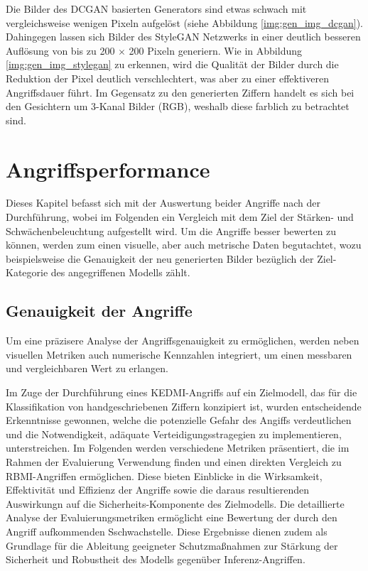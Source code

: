 Die Bilder des DCGAN basierten Generators sind etwas schwach mit vergleichsweise wenigen Pixeln aufgelöst (siehe Abbildung \ref{img:gen_img_dcgan}). Dahingegen lassen sich Bilder des StyleGAN Netzwerks in einer deutlich besseren Auflösung von bis zu 200 $\times$ 200 Pixeln generiern. Wie in Abbildung \ref{img:gen_img_stylegan} zu erkennen, wird die Qualität der Bilder durch die Reduktion der Pixel deutlich verschlechtert, was aber zu einer effektiveren Angriffsdauer führt. Im Gegensatz zu den generierten Ziffern handelt es sich bei den Gesichtern um 3-Kanal Bilder (RGB), weshalb diese farblich zu betrachtet sind.
\section{Angriffsperformance}
Dieses Kapitel befasst sich mit der Auswertung beider Angriffe nach der Durchführung, wobei im Folgenden ein Vergleich mit dem Ziel der Stärken- und Schwächenbeleuchtung aufgestellt wird. Um die Angriffe besser bewerten zu können, werden zum einen visuelle, aber auch metrische Daten begutachtet, wozu beispielsweise die Genauigkeit der neu generierten Bilder bezüglich der Ziel-Kategorie des \glqq angegriffenen\grqq{} Modells zählt.
\subsection{Genauigkeit der Angriffe}
Um eine präzisere Analyse der Angriffsgenauigkeit zu ermöglichen, werden neben visuellen Metriken auch numerische Kennzahlen integriert, um einen messbaren und vergleichbaren Wert zu erlangen.

Im Zuge der Durchführung eines \glqq KEDMI\grqq-Angriffs auf ein Zielmodell, das für die Klassifikation von handgeschriebenen Ziffern konzipiert ist, wurden entscheidende Erkenntnisse gewonnen, welche die potenzielle Gefahr des Angiffs verdeutlichen und die Notwendigkeit, adäquate Verteidigungsstragegien zu implementieren, unterstreichen. Im Folgenden werden verschiedene Metriken präsentiert, die im Rahmen der Evaluierung Verwendung finden und einen direkten Vergleich zu \glqq RBMI\grqq-Angriffen ermöglichen. Diese bieten Einblicke in die Wirksamkeit, Effektivität und Effizienz der Angriffe sowie die daraus resultierenden Auswirkungn auf die Sicherheits-Komponente des Zielmodells. Die detaillierte Analyse der Evaluierungsmetriken ermöglicht eine Bewertung der durch den Angriff aufkommenden Sschwachstelle. Diese Ergebnisse dienen zudem als Grundlage für die Ableitung geeigneter Schutzmaßnahmen zur Stärkung der Sicherheit und Robustheit des Modells gegenüber Inferenz-Angriffen.

